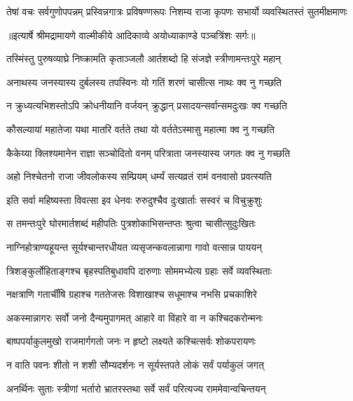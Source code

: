 \fourlineindentedshloka
{तेषां वचः सर्वगुणोपपन्नम्}
{प्रस्विन्नगात्रः प्रविषण्णरूपः}
{निशम्य राजा कृपणः सभार्यो}
{व्यवस्थितस्तं सुतमीक्षमाणः} %


{॥इत्यार्षे श्रीमद्रामायणे वाल्मीकीये आदिकाव्ये अयोध्याकाण्डे पञ्चत्रिंशः सर्गः॥}


\twolineshloka
{तस्मिंस्तु पुरुषव्याघ्रे निष्क्रामति कृताञ्जलौ}
{आर्तशब्दो हि संजज्ञे स्त्रीणामन्तःपुरे महान्} %

\twolineshloka
{अनाथस्य जनस्यास्य दुर्बलस्य तपस्विनः}
{यो गतिं शरणं चासीत्स नाथः क्व नु गच्छति} %

\twolineshloka
{न क्रुध्यत्यभिशस्तोऽपि क्रोधनीयानि वर्जयन्}
{क्रुद्धान् प्रसादयन्सर्वान्समदुःखः क्व गच्छति} %

\twolineshloka
{कौसल्यायां महातेजा यथा मातरि वर्तते}
{तथा यो वर्ततेऽस्मासु महात्मा क्व नु गच्छति} %

\twolineshloka
{कैकेय्या क्लिश्यमानेन राज्ञा सञ्चोदितो वनम्}
{परित्राता जनस्यास्य जगतः क्व नु गच्छति} %

\twolineshloka
{अहो निश्चेतनो राजा जीवलोकस्य सम्प्रियम्}
{धर्म्यं सत्यव्रतं रामं वनवासो प्रवत्स्यति} %

\twolineshloka
{इति सर्वा महिष्यस्ता विवत्सा इव धेनवः}
{रुरुदुश्चैव दुःखार्ताः सस्वरं च विचुक्रुशुः} %

\twolineshloka
{स तमन्तःपुरे घोरमार्तशब्दं महीपतिः}
{पुत्रशोकाभिसन्तप्तः श्रुत्वा चासीत्सुदुःखितः} %

\twolineshloka
{नाग्निहोत्राण्यहूयन्त सूर्यश्चान्तरधीयत}
{व्यसृजन्कवलान्नागा गावो वत्सान्न पाययन्} %

\twolineshloka
{त्रिशङ्कुर्लोहिताङ्गश्च बृहस्पतिबुधावपि}
{दारुणाः सोममभ्येत्य ग्रहाः सर्वे व्यवस्थिताः} %

\twolineshloka
{नक्षत्राणि गतार्चींषि ग्रहाश्च गततेजसः}
{विशाखाश्च सधूमाश्च नभसि प्रचकाशिरे} %

\twolineshloka
{अकस्मान्नागरः सर्वो जनो दैन्यमुपागमत्}
{आहारे वा विहारे वा न कश्चिदकरोन्मनः} %

\twolineshloka
{बाष्पपर्याकुलमुखो राजमार्गगतो जनः}
{न हृष्टो लक्ष्यते कश्चित्सर्वः शोकपरायणः} %

\twolineshloka
{न वाति पवनः शीतो न शशी सौम्यदर्शनः}
{न सूर्यस्तपते लोकं सर्वं पर्याकुलं जगत्} %

\twolineshloka
{अनर्थिनः सुताः स्त्रीणां भर्तारो भ्रातरस्तथा}
{सर्वे सर्वं परित्यज्य राममेवान्वचिन्तयन्} %

